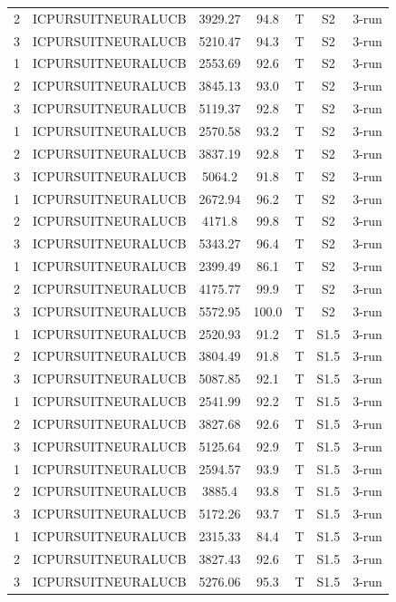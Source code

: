\documentclass[11pt]{article}
\begin{document}
\begin{center}
\begin{longtable}{|c|c|c|c|c|c|c|}
2 & ICPURSUITNEURALUCB & 3929.27 & 94.8 & T & S2 & 3-run \\
3 & ICPURSUITNEURALUCB & 5210.47 & 94.3 & T & S2 & 3-run \\
1 & ICPURSUITNEURALUCB & 2553.69 & 92.6 & T & S2 & 3-run \\
2 & ICPURSUITNEURALUCB & 3845.13 & 93.0 & T & S2 & 3-run \\
3 & ICPURSUITNEURALUCB & 5119.37 & 92.8 & T & S2 & 3-run \\
1 & ICPURSUITNEURALUCB & 2570.58 & 93.2 & T & S2 & 3-run \\
2 & ICPURSUITNEURALUCB & 3837.19 & 92.8 & T & S2 & 3-run \\
3 & ICPURSUITNEURALUCB & 5064.2 & 91.8 & T & S2 & 3-run \\
1 & ICPURSUITNEURALUCB & 2672.94 & 96.2 & T & S2 & 3-run \\
2 & ICPURSUITNEURALUCB & 4171.8 & 99.8 & T & S2 & 3-run \\
3 & ICPURSUITNEURALUCB & 5343.27 & 96.4 & T & S2 & 3-run \\
1 & ICPURSUITNEURALUCB & 2399.49 & 86.1 & T & S2 & 3-run \\
2 & ICPURSUITNEURALUCB & 4175.77 & 99.9 & T & S2 & 3-run \\
3 & ICPURSUITNEURALUCB & 5572.95 & 100.0 & T & S2 & 3-run \\
1 & ICPURSUITNEURALUCB & 2520.93 & 91.2 & T & S1.5 & 3-run \\
2 & ICPURSUITNEURALUCB & 3804.49 & 91.8 & T & S1.5 & 3-run \\
3 & ICPURSUITNEURALUCB & 5087.85 & 92.1 & T & S1.5 & 3-run \\
1 & ICPURSUITNEURALUCB & 2541.99 & 92.2 & T & S1.5 & 3-run \\
2 & ICPURSUITNEURALUCB & 3827.68 & 92.6 & T & S1.5 & 3-run \\
3 & ICPURSUITNEURALUCB & 5125.64 & 92.9 & T & S1.5 & 3-run \\
1 & ICPURSUITNEURALUCB & 2594.57 & 93.9 & T & S1.5 & 3-run \\
2 & ICPURSUITNEURALUCB & 3885.4 & 93.8 & T & S1.5 & 3-run \\
3 & ICPURSUITNEURALUCB & 5172.26 & 93.7 & T & S1.5 & 3-run \\
1 & ICPURSUITNEURALUCB & 2315.33 & 84.4 & T & S1.5 & 3-run \\
2 & ICPURSUITNEURALUCB & 3827.43 & 92.6 & T & S1.5 & 3-run \\
3 & ICPURSUITNEURALUCB & 5276.06 & 95.3 & T & S1.5 & 3-run \\

\end{longtable}
\end{center}
\end{document}
